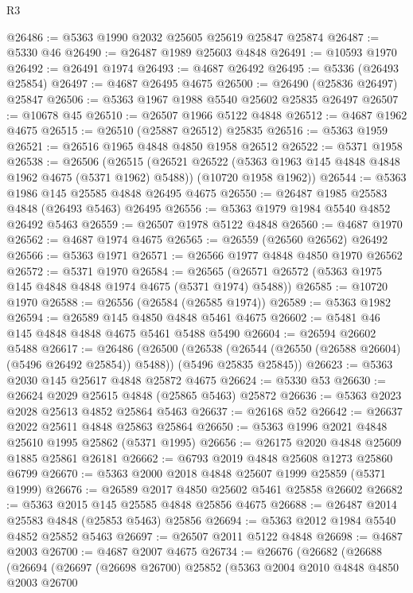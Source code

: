 \begin{lexlean}{R3}
\begin{coremodule}
@26486 := @5363 @1990 @2032 @25605 @25619 @25847 @25874
@26487 := @5330 @46
@26490 := @26487 @1989 @25603 @4848
@26491 := @10593 @1970
@26492 := @26491 @1974
@26493 := @4687 @26492
@26495 := @5336 (@26493 @25854)
@26497 := @4687 @26495 @4675
@26500 := @26490 (@25836 @26497) @25847
@26506 := @5363 @1967 @1988 @5540 @25602 @25835 @26497
@26507 := @10678 @45
@26510 := @26507 @1966 @5122 @4848
@26512 := @4687 @1962 @4675
@26515 := @26510 (@25887 @26512) @25835
@26516 := @5363 @1959
@26521 := @26516 @1965 @4848 @4850 @1958 @26512
@26522 := @5371 @1958
@26538 := @26506
    (@26515
      (@26521 @26522 (@5363 @1963 @145 @4848 @4848 @1962 @4675 (@5371 @1962) @5488))
      (@10720 @1958 @1962))
@26544 := @5363 @1986 @145 @25585 @4848 @26495 @4675
@26550 := @26487 @1985 @25583 @4848 (@26493 @5463) @26495
@26556 := @5363 @1979 @1984 @5540 @4852 @26492 @5463
@26559 := @26507 @1978 @5122 @4848
@26560 := @4687 @1970
@26562 := @4687 @1974 @4675
@26565 := @26559 (@26560 @26562) @26492
@26566 := @5363 @1971
@26571 := @26566 @1977 @4848 @4850 @1970 @26562
@26572 := @5371 @1970
@26584 := @26565 (@26571 @26572 (@5363 @1975 @145 @4848 @4848 @1974 @4675 (@5371 @1974) @5488))
@26585 := @10720 @1970
@26588 := @26556 (@26584 (@26585 @1974))
@26589 := @5363 @1982
@26594 := @26589 @145 @4850 @4848 @5461 @4675
@26602 := @5481 @46 @145 @4848 @4848 @4675 @5461 @5488 @5490
@26604 := @26594 @26602 @5488
@26617 := @26486
    (@26500
      (@26538 (@26544 (@26550 (@26588 @26604) (@5496 @26492 @25854)) @5488))
      (@5496 @25835 @25845))
@26623 := @5363 @2030 @145 @25617 @4848 @25872 @4675
@26624 := @5330 @53
@26630 := @26624 @2029 @25615 @4848 (@25865 @5463) @25872
@26636 := @5363 @2023 @2028 @25613 @4852 @25864 @5463
@26637 := @26168 @52
@26642 := @26637 @2022 @25611 @4848 @25863 @25864
@26650 := @5363 @1996 @2021 @4848 @25610 @1995 @25862 (@5371 @1995)
@26656 := @26175 @2020 @4848 @25609 @1885 @25861 @26181
@26662 := @6793 @2019 @4848 @25608 @1273 @25860 @6799
@26670 := @5363 @2000 @2018 @4848 @25607 @1999 @25859 (@5371 @1999)
@26676 := @26589 @2017 @4850 @25602 @5461 @25858 @26602
@26682 := @5363 @2015 @145 @25585 @4848 @25856 @4675
@26688 := @26487 @2014 @25583 @4848 (@25853 @5463) @25856
@26694 := @5363 @2012 @1984 @5540 @4852 @25852 @5463
@26697 := @26507 @2011 @5122 @4848
@26698 := @4687 @2003
@26700 := @4687 @2007 @4675
@26734 := @26676
    (@26682
      (@26688
        (@26694
          (@26697
            (@26698 @26700)
            @25852
            (@5363
              @2004
              @2010
              @4848
              @4850
              @2003
              @26700

\end{coremodule}
\end{lexlean}
